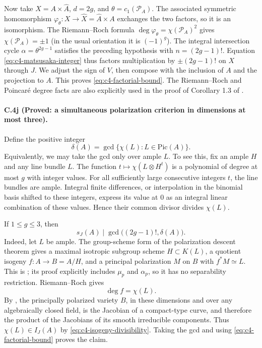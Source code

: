 Now take $X=A\times\widehat A$, $d=2g$, and
$\theta=c_1(\mathcal P_A)$. The associated symmetric homomorphism
$\varphi_\theta:X\to\widehat X=\widehat A\times A$ exchanges the two
factors, so it is an isomorphism. The Riemann--Roch formula
$\deg\varphi_\theta=\chi(\mathcal P_A)^2$ gives
$\chi(\mathcal P_A)=\pm1$ (in the usual orientation it is $(-1)^g$).
The integral intersection cycle $\alpha=\theta^{2g-1}$ satisfies the
preceding hypothesis with $n=(2g-1)!$.
Equation \eqref{eq:c4-matsusaka-integer} thus factors multiplication
by $\pm(2g-1)!$ on $X$ through $J$.
We adjust the sign of $V$, then compose with the inclusion of $A$
and the projection to $A$. This proves \eqref{eq:c4-factorial-bound}.
The Riemann--Roch and Poincar\'e degree facts are also explicitly
used in the proof of Corollary 1.3 of
\citet{cyScaviaSuzuki2025}.

\paragraph{C.4j (Proved: a simultaneous polarization criterion in dimensions at most three).}
Define the positive integer
\[
 \delta(A)=\gcd\{\chi(L):L\in\mathrm{Pic}(A)\}.
\]
Equivalently, we may take the gcd only over ample $L$.
To see this, fix an ample $H$ and any line bundle $L$.
The function $t\mapsto\chi(L\otimes H^t)$ is a polynomial of degree at
most $g$ with integer values. For all sufficiently large consecutive
integers $t$, the line bundles are ample. Integral finite differences,
or interpolation in the binomial basis shifted to these integers,
express its value at $0$ as an integral linear combination of these
values. Hence their common divisor divides $\chi(L)$.

If $1\le g\le3$, then
\begin{equation}\label{eq:c4-polarization-gcd}
 \boxed{\quad s_J(A)\mid
             \gcd\bigl((2g-1)!,\delta(A)\bigr).\quad}
\end{equation}
Indeed, let $L$ be ample. The group-scheme form of the polarization
descent theorem gives a maximal isotropic subgroup scheme
$H\subset K(L)$, a quotient isogeny $f:A\to B=A/H$, and a principal
polarization $M$ on $B$ with $f^*M\simeq L$.
This is \citet[Section 23, Theorem 4 and Corollary 1,
pp.~233--234]{frC4Mumford1970}; its proof explicitly includes
$\mu_p$ and $\alpha_p$, so it has no separability restriction.
Riemann--Roch gives
\[
                       \deg f=\chi(L).
\]
By \citet[Theorem 4, p.~2 of the opened preprint]{cyOortUeno1973}, the principally
polarized variety $B$, in these dimensions and over any algebraically
closed field, is the Jacobian of a compact-type curve, and therefore
the product of the Jacobians of its smooth irreducible components.
Thus $\chi(L)\in I_J(A)$ by \eqref{eq:c4-isogeny-divisibility}.
Taking the gcd and using \eqref{eq:c4-factorial-bound} proves the claim.

